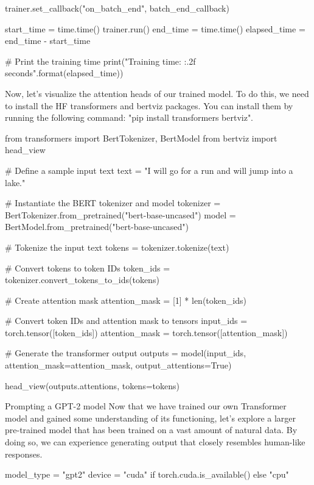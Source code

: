 \begin{exercise}
\begin{python}
trainer.set_callback("on_batch_end", batch_end_callback)

start_time = time.time()
trainer.run()
end_time = time.time()
elapsed_time = end_time - start_time

# Print the training time
print("Training time: {:.2f} seconds".format(elapsed_time))
\end{python}

Now, let's visualize the attention heads of our trained model. To do this, we need to install the HF transformers and bertviz packages. You can install them by running the following command: "pip install transformers bertviz".


\begin{python}
from transformers import BertTokenizer, BertModel
from bertviz import head_view

# Define a sample input text
text = "I will go for a run and will jump into a lake."

# Instantiate the BERT tokenizer and model
tokenizer = BertTokenizer.from_pretrained("bert-base-uncased")
model = BertModel.from_pretrained("bert-base-uncased")

# Tokenize the input text
tokens = tokenizer.tokenize(text)

# Convert tokens to token IDs
token_ids = tokenizer.convert_tokens_to_ids(tokens)

# Create attention mask
attention_mask = [1] * len(token_ids)

# Convert token IDs and attention mask to tensors
input_ids = torch.tensor([token_ids])
attention_mask = torch.tensor([attention_mask])

# Generate the transformer output
outputs = model(input_ids, attention_mask=attention_mask, output_attentions=True)

head_view(outputs.attentions, tokens=tokens)
\end{python}



\begin{exercise} Prompting a GPT-2 model
Now that we have trained our own Transformer model and gained some understanding of its functioning, let's explore a larger pre-trained model that has been trained on a vast amount of natural data. By doing so, we can experience generating output that closely resembles human-like responses.

\begin{python}
model_type = "gpt2"
device = "cuda" if torch.cuda.is_available() else "cpu"


\end{python}
\end{exercise}
\end{exercise}
